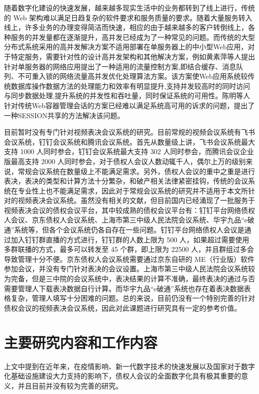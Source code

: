 随着数字化建设的快速发展，越来越多现实生活中的业务都转到了线上进行，传统的 Web 架构难以满足日趋复杂的软件要求和服务质量的要求。随着大量服务转入线上，许多业务的办理变得简洁而快速，相应的由于越来越多的客户转倒线上，各种服务的并发量都在逐渐提升，高并发已经成为了一种常见的问题。而传统的大型分布式系统采用的高并发解决方案不适用部署在单服务器上的中小型Web应用，对于特定服务，需要针对性的设计高并发架构和其他解决方案，例如黄素萍\cite{Huang}等人提出针对单服务器的网络应用提出了一种适用的流量控制方案,即结合缓存、消息队列、不可重入锁的网络流量高并发优化处理算法方案。该方案使Web应用系统较传统数据库操作数据方法的处理能力和效率有明显提升,支持并发较高时的同时访问与同步数据处理,提升系统的并发性和吞吐量，同时保证系统的可用性。陈明\cite{Chen}等人针对传统Web容器管理会话的方案已经难以满足系统高可用的诉求的问题，提出了一种SESSION共享的方法解决该问题。

目前暂时没有专门针对视频表决会议系统的研究。目前常规的视频会议系统有飞书会议系统，钉钉会议系统和腾讯会议系统。首先从数量级上讲，飞书会议系统最大支持 1000 人同时参会，钉钉会议系统最大支持 302 人同时参会，而腾讯会议企业版最高支持 2000 人同时参会，对于债权人会议人数动辄千人，偶尔上万的级别来说，常规会议系统在数量级上不能满足需求。另外，债权人会议的重中之重是进行表决，表决的类型和计算方法十分繁杂，和破产相关法律紧密挂钩，传统的会议系统在专业性上也不能满足需求，因此对于常规会议系统的研究并不适用于本文所针对的视频表决会议系统。虽然没有相关的文献，但目前国内已经涌现了一批服务于视频表决会议的债权会议平台，其中较成熟的债权会议平台有：钉钉平台网络债权人会议、京东债权人会议系统、上海市第三中级人民法院会议系统、华宇九品“e破通”系统等，但各个会议系统仍各自存在一些问题。钉钉平台网络债权人会议是通过加入钉钉群直播的方式进行，钉钉群的人数上限为 500 人，如果超过需要使用多群联播的方式，最多可以转发至 45 个群，即上限为 22500 人，并且群组过多会导致管理十分不便。京东债权人会议系统需要通过京东自研的 ME（行业版）软件参加会议，并没有专门针对表决的会议设置。上海市第三中级人民法院会议系统较为完备，但是三中院的会议系统中，表决结果的计算不准确，最终表决的通过与否需要管理人下载表决数据自行计算。而华宇九品“e破通”系统也存在着表决数据表格复杂，管理人填写十分困难的问题。总的来说，目前仍没有一个特别完善的针对债权会议的视频表决会议系统，因此对此课题进行研究具有一定的参考价值。

\section{主要研究内容和工作内容}
上文中提到在近年来，在疫情影响、新一代数字技术的快速发展以及国家对于数字化基础设施建设大力支持的影响下，债权人会议的全面数字化具有极其重要的意义，并且目前并没有较为完善的研究。

